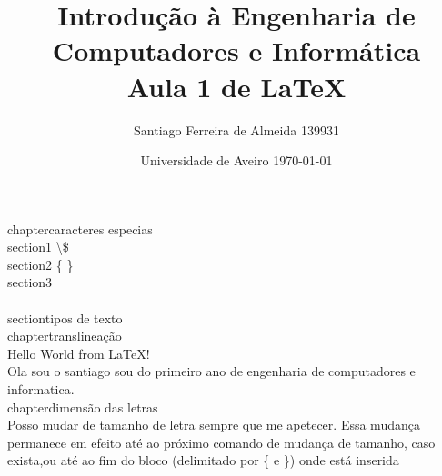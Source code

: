 \documentclass[]{report}
\title{\textbf{Introdução à Engenharia de Computadores e Informática \\ Aula 1 de \LaTeX}}
\author{Santiago Ferreira de Almeida 139931}
\date{Universidade de Aveiro \today}
\begin{document}
\maketitle
\renewcommand{\contentsname}{Índice}
\tableofcontents

chapter{caracteres especias}\\
section{1} \textbackslash \$ \~\\
section{2} \{ \} \\
section{3} \[ \]\\
section{tipos de texto}\\
chapter{translineação}\\

Hello World from \LaTeX!\\
Ola sou o santiago sou do primeiro ano de engenharia de computadores e informatica.\\
chapter{dimensão das letras}\\
Posso {\small mudar} de {\huge tamanho} de letra sempre que
me apetecer. Essa \Large mudança permanece em efeito
{\normalsize até} ao próximo comando de mudança de tamanho,
caso exista,\normalsize\space ou até ao fim do bloco
(delimitado por \{ e \}) onde está inserida\\
\end{document}
